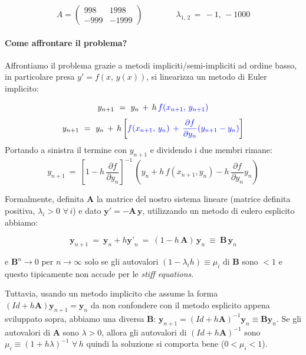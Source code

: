 \documentclass{article}
\begin{document}
	\[
	A = \begin{pmatrix}
		998 & 1998 \\
		-999 & -1999
	\end{pmatrix}
	\quad \quad \quad \quad \lambda_{1,\, 2}\, =\, -1,\, -1000
	\]
	
	\paragraph{Come affrontare il problema?}
	
	Affrontiamo il problema grazie a metodi impliciti/semi-impliciti ad ordine basso, in particolare presa $y'=f(x,\, y(x))$, si linearizza un metodo di Euler implicito:
	
	\[ y_{n+1}\ =\ y_n\, +\, h\, \color{blue}{f(x_{n+1},\, y_{n+1})}\]
	\[ y_{n+1}\ =\ y_n\, +\, h\left[ \color{blue}{ f(x_{n+1},\, y_n) \, +\, \frac{\partial
			f}{\partial y_n} (y_{n+1} - y_n)} \color{black}\right] \]
	Portando a sinistra il termine con $y_{n+1}$ e dividendo i due membri rimane:
	\[ y_{n+1}\ =\ \left[  1-h\, \frac{\partial
		f}{\partial y_n}  \right]^{-1}\, \left( y_n + h\, f(x_{n+1}, y_{n} ) - h\, \frac{\partial f}{\partial y_n} y_n \right)\]
	
	
	Formalmente, definita $\textbf{A}$ la matrice del nostro sistema lineare (matrice definita positiva, $\lambda_i > 0 \, \, \forall\,  i$) e dato $\textbf{y}'=-\textbf{A}\, \textbf{y}$, utilizzando un metodo di eulero esplicito abbiamo:
	
	\[ \textbf{y}_{n+1}\ =\ \textbf{y}_n + h\textbf{y'}_n\ =\  ( 1 - h\, \textbf{A} )\, \textbf{y}_n\ \equiv\ \textbf{B}\, \textbf{y}_n \]
	
	e $\textbf{B}^n\rightarrow 0$ per $n\rightarrow \infty$ solo se gli autovalori $(1-\lambda_i h)\equiv \mu_i$ di \textbf{B} sono $<1$ e questo tipicamente non accade per le \emph{stiff equations}.
	
	Tuttavia, usando un metodo implicito che assume la forma $\boxed{(Id + h\textbf{A}) \textbf{y}_{n+1} = \textbf{y}_n}$ da non confondere con il metodo esplicito appena sviluppato sopra, abbiamo una diversa \textbf{B}: $\textbf{y}_{n+1} = (Id + h\textbf{A})^{-1}\textbf{y}_n\equiv \textbf{B} \textbf{y}_n$.
	Se gli autovalori di \textbf{A} sono $\lambda>0$, allora gli autovalori di $(Id+h\textbf{A})^{-1}$ sono $\mu_i\equiv(1+h\lambda)^{-1}\, \, \forall\, h$ quindi la soluzione si comporta bene ($0<\mu_i<1$).
	
	
	
	
	\vspace{0.5cm}
\end{document}
